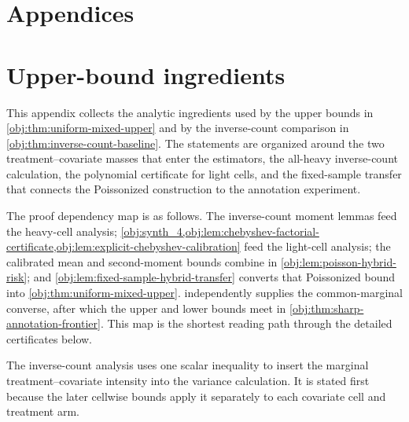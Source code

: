 \documentclass[11pt]{article}
\begin{document}
\appendix

\section*{Appendices}

\section{Upper-bound ingredients}\label{sec:appendix-upper}

This appendix collects the analytic ingredients used by the upper bounds in \cref{obj:thm:uniform-mixed-upper} and by the inverse-count comparison in \cref{obj:thm:inverse-count-baseline}. The statements are organized around the two treatment--covariate masses that enter the estimators, the all-heavy inverse-count calculation, the polynomial certificate for light cells, and the fixed-sample transfer that connects the Poissonized construction to the annotation experiment.

The proof dependency map is as follows. The inverse-count moment lemmas feed the heavy-cell analysis; \cref{obj:synth_4,obj:lem:chebyshev-factorial-certificate,obj:lem:explicit-chebyshev-calibration} feed the light-cell analysis; the calibrated mean and second-moment bounds combine in \cref{obj:lem:poisson-hybrid-risk}; and \cref{obj:lem:fixed-sample-hybrid-transfer} converts that Poissonized bound into \cref{obj:thm:uniform-mixed-upper}.  independently supplies the common-marginal converse, after which the upper and lower bounds meet in \cref{obj:thm:sharp-annotation-frontier}. This map is the shortest reading path through the detailed certificates below.

The inverse-count analysis uses one scalar inequality to insert the marginal treatment--covariate intensity into the variance calculation. It is stated first because the later cellwise bounds apply it separately to each covariate cell and treatment arm.
\end{document}
